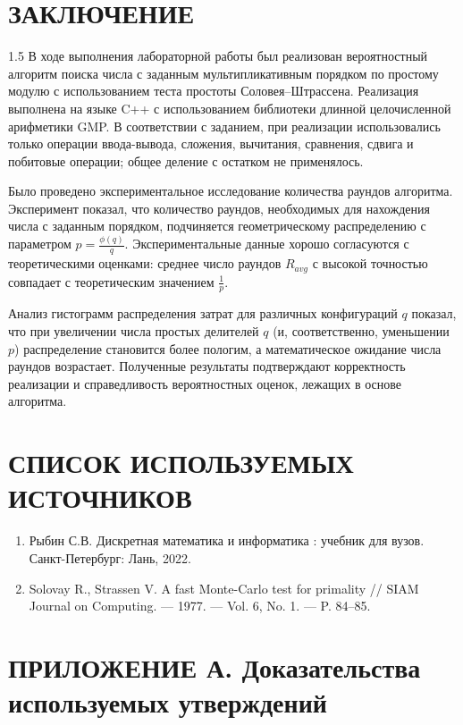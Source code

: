 \documentclass[14pt,a4paper]{extarticle}
\begin{document}
\newpage
\section*{ЗАКЛЮЧЕНИЕ}
\begin{spacing}{1.5} 
В ходе выполнения лабораторной работы был реализован вероятностный алгоритм поиска числа с заданным мультипликативным порядком по простому модулю с использованием теста простоты Соловея–Штрассена. Реализация выполнена на языке C++ с использованием библиотеки длинной целочисленной арифметики GMP. В соответствии с заданием, при реализации использовались только операции ввода-вывода, сложения, вычитания, сравнения, сдвига и побитовые операции; общее деление с остатком не применялось.

Было проведено экспериментальное исследование количества раундов алгоритма. Эксперимент показал, что количество раундов, необходимых для нахождения числа с заданным порядком, подчиняется геометрическому распределению с параметром \(p = \frac{\phi(q)}{q}\). Экспериментальные данные хорошо согласуются с теоретическими оценками: среднее число раундов \(R_{avg}\) с высокой точностью совпадает с теоретическим значением \(\frac{1}{p}\).

Анализ гистограмм распределения затрат для различных конфигураций \(q\) показал, что при увеличении числа простых делителей \(q\) (и, соответственно, уменьшении \(p\)) распределение становится более пологим, а математическое ожидание числа раундов возрастает. Полученные результаты подтверждают корректность реализации и справедливость вероятностных оценок, лежащих в основе алгоритма.
\end{spacing}

\newpage
\section*{СПИСОК ИСПОЛЬЗУЕМЫХ ИСТОЧНИКОВ}
\begin{enumerate}
    \item Рыбин С.В. Дискретная математика и информатика : учебник для вузов. Санкт-Петербург: Лань, 2022.
    \item Solovay R., Strassen V. A fast Monte-Carlo test for primality // SIAM Journal on Computing. — 1977. — Vol. 6, No. 1. — P. 84–85.
\end{enumerate}

\newpage
\section*{ПРИЛОЖЕНИЕ А. Доказательства используемых утверждений}
\end{document}
